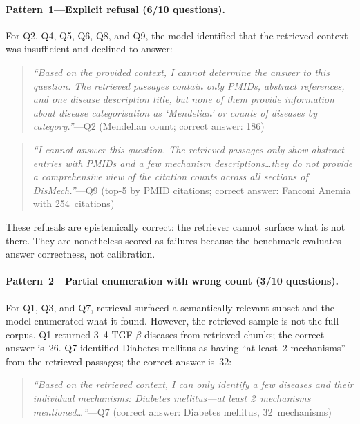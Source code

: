 \paragraph{Pattern~1---Explicit refusal (6/10 questions).}
For Q2, Q4, Q5, Q6, Q8, and Q9, the model identified that the retrieved context
was insufficient and declined to answer:

\begin{quote}
\emph{``Based on the provided context, I cannot determine the answer to this
question. The retrieved passages contain only PMIDs, abstract references, and
one disease description title, but none of them provide information about
disease categorisation as `Mendelian' or counts of diseases by
category.''}\quad---Q2 (Mendelian count; correct answer: 186)
\end{quote}

\begin{quote}
\emph{``I cannot answer this question. The retrieved passages only show abstract
entries with PMIDs and a few mechanism descriptions\ldots they do not provide a
comprehensive view of the citation counts across all sections of
DisMech.''}\quad---Q9 (top-5 by PMID citations; correct answer: Fanconi Anemia
with 254~citations)
\end{quote}

These refusals are epistemically correct: the retriever cannot surface what is
not there. They are nonetheless scored as failures because the benchmark
evaluates answer correctness, not calibration.

\paragraph{Pattern~2---Partial enumeration with wrong count (3/10 questions).}
For Q1, Q3, and Q7, retrieval surfaced a semantically relevant subset and the
model enumerated what it found. However, the retrieved sample is not the full
corpus. Q1 returned 3--4 TGF-$\beta$ diseases from retrieved chunks; the
correct answer is~26. Q7 identified Diabetes mellitus as having ``at least~2
mechanisms'' from the retrieved passages; the correct answer is~32:

\begin{quote}
\emph{``Based on the retrieved context, I can only identify a few diseases and
their individual mechanisms: Diabetes mellitus---at least 2~mechanisms
mentioned\ldots''}\quad---Q7 (correct answer: Diabetes mellitus, 32~mechanisms)
\end{quote}

